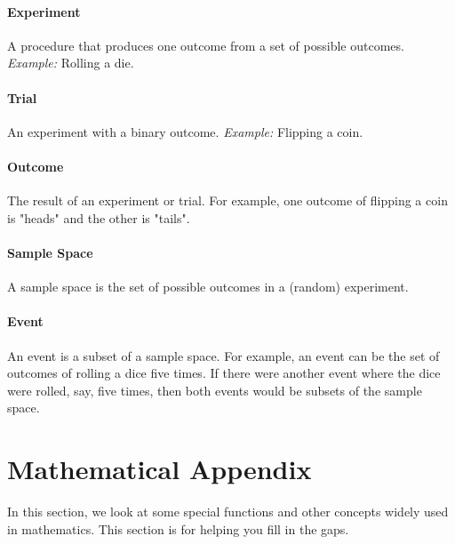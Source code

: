 \documentclass{article}
\begin{document}
\paragraph{Experiment} A procedure that produces one outcome from a set of possible outcomes.  
\emph{Example:} Rolling a die.

\paragraph{Trial} An experiment with a binary outcome. \emph{Example:} Flipping a coin.

\paragraph{Outcome} The result of an experiment or trial. For example, one outcome of flipping a coin is "heads" and the other is "tails".

\paragraph{Sample Space} A sample space is the set of possible outcomes in a (random) experiment.

\paragraph{Event} An event is a subset of a sample space. For example, an event can be the set of outcomes of rolling a dice five times. If there were another event where the dice were rolled, say, five times, then both events would be subsets of the sample space.

\newpage
\section{Mathematical Appendix}
In this section, we look at some special functions and other concepts widely used in mathematics. This section is for helping you fill in the gaps.

\end{document}
